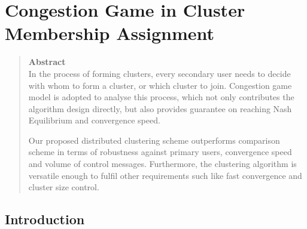 \chapter{Congestion Game in Cluster Membership Assignment}
\begin{quote}
{\textbf{Abstract}\\
\small In the process of forming clusters, every secondary user needs to decide with whom to form a cluster, or which cluster to join.
Congestion game model is adopted to analyse this process, which not only contributes the algorithm design directly, but also provides guarantee on reaching Nash Equilibrium and convergence speed.

Our proposed distributed clustering scheme outperforms comparison scheme in terms of robustness against primary users, convergence speed and volume of control messages.
Furthermore, the clustering algorithm is versatile enough to fulfil other requirements such like fast convergence and cluster size control.
}
\end{quote}


\section{Introduction}
\label{intro}







